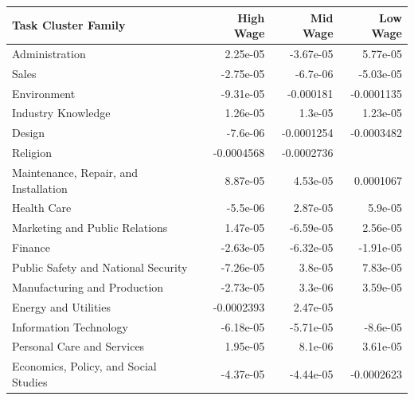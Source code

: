 \documentclass[letterpaper]{article} %
\begin{document}
\begin{table}[h!]
\centering
\tiny
\begin{tabular}{l | r | r | r}
                         Task Cluster Family &   High Wage &    Mid Wage &    Low Wage \\
\hline \hline
                              Administration &    2.25e-05 &   -3.67e-05 &    5.77e-05 \\
                                       Sales &   -2.75e-05 &    -6.7e-06 &   -5.03e-05 \\
                                 Environment &   -9.31e-05 &   -0.000181 &  -0.0001135 \\
                          Industry Knowledge &    1.26e-05 &     1.3e-05 &    1.23e-05 \\
                                      Design &    -7.6e-06 &  -0.0001254 &  -0.0003482 \\
                                    Religion &  -0.0004568 &  -0.0002736 &          \\
       Maintenance, Repair, and Installation &    8.87e-05 &    4.53e-05 &   0.0001067 \\
                                 Health Care &    -5.5e-06 &    2.87e-05 &     5.9e-05 \\
              Marketing and Public Relations &    1.47e-05 &   -6.59e-05 &    2.56e-05 \\
                                     Finance &   -2.63e-05 &   -6.32e-05 &   -1.91e-05 \\
         Public Safety and National Security &   -7.26e-05 &     3.8e-05 &    7.83e-05 \\
                Manufacturing and Production &   -2.73e-05 &     3.3e-06 &    3.59e-05 \\
                        Energy and Utilities &  -0.0002393 &    2.47e-05 &          \\
                      Information Technology &   -6.18e-05 &   -5.71e-05 &    -8.6e-05 \\
                  Personal Care and Services &    1.95e-05 &     8.1e-06 &    3.61e-05 \\
       Economics, Policy, and Social Studies &   -4.37e-05 &   -4.44e-05 &  -0.0002623 \\

\end{tabular}
\end{table}
\end{document}
